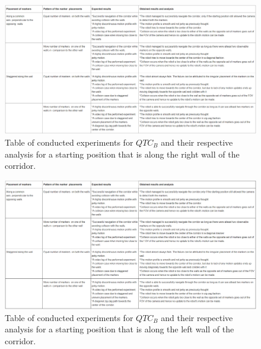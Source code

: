 \begin{figure}
	\includegraphics[scale = 0.6]{"images/right table"}
	\caption{Table of conducted experiments for $QTC_B$ and their respective analysis for a starting position that is along the right wall of the corridor.}
	\label{fig:right-table}
\end{figure}


\begin{figure}
	\includegraphics[scale = 0.6]{images/left_table}
	\caption{Table of conducted experiments for $QTC_B$ and their respective analysis for a starting position that is along the left wall of the corridor.}
	\label{fig:left-table}
\end{figure}

